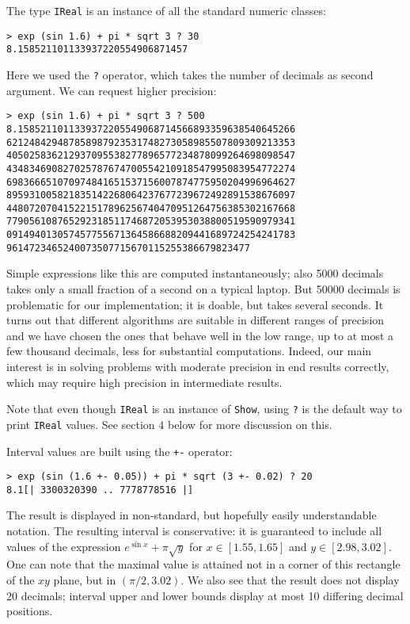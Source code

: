 \documentclass[9pt, a4, twocolumn]{article}
\begin{document}
The type \texttt{IReal} is an instance of all the standard
numeric classes:
\begin{verbatim}
> exp (sin 1.6) + pi * sqrt 3 ? 30
8.158521101133937220554906871457
\end{verbatim}
Here we used the \texttt{?} operator, which takes the number of
decimals as second argument. We can request higher precision:
{\small
\begin{verbatim}
> exp (sin 1.6) + pi * sqrt 3 ? 500
8.1585211011339372205549068714566893359638540645266
621248429487858987923531748273058985507809309213353
405025836212937095538277896577234878099264698098547
434834690827025787674700554210918547995083954772274
698366651070974841651537156007874775950204996964627
895931005821835142268064237677239672492891538676097
448072070415221517896256740470951264756385302167668
779056108765292318511746872053953038800519590979341
091494013057457755671364586688209441689724254241783
9614723465240073507715670115255386679823477
\end{verbatim}
}
Simple expressions like this are computed instantaneously; also
5000 decimals takes only a small fraction of a second on a typical laptop. 
But 50000 decimals is problematic for our implementation; it is
doable, but takes several seconds. It turns
out that different algorithms are suitable in different ranges of
precision and we have chosen the ones that behave well in the low
range, up to at most a few thousand decimals, less for substantial
computations. Indeed, our main interest is in solving problems with 
moderate precision in end results correctly, which may require high precision in
intermediate results.

Note that even though \texttt{IReal} is an instance of \texttt{Show}, using
\texttt{?} is the default way to print \texttt{IReal} values. See
section 4 below for more discussion on this.

Interval values are built using the \texttt{+-} operator:
\begin{verbatim}
> exp (sin (1.6 +- 0.05)) + pi * sqrt (3 +- 0.02) ? 20
8.1[| 3300320390 .. 7778778516 |]
\end{verbatim}
The result is displayed in non-standard, but hopefully easily understandable
notation. The resulting interval is conservative: it is guaranteed to include all
values of the expression $e^{\sin x} + \pi \sqrt{y}$ for $x \in
[1.55,1.65]$ and $y \in [2.98,3.02]$. One can note that the maximal
value is attained not in a corner of this rectangle of the $xy$ plane,
but in $(\pi/2, 3.02)$. We also see that the result does not display 20
decimals; interval upper and lower bounds display at most 10 differing
decimal positions.
\end{document}
